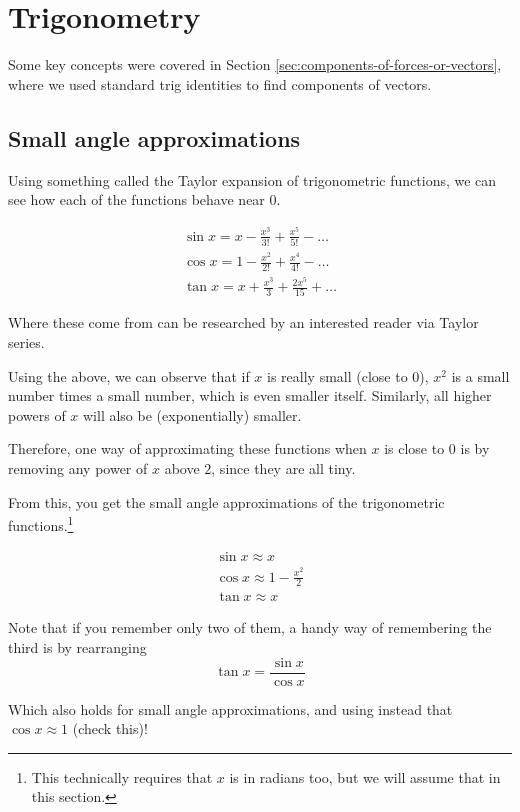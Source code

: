 \section{Trigonometry} \label{sec:trig}

Some key concepts were covered in Section \ref{sec:components-of-forces-or-vectors}, where we used standard trig identities to find components of vectors.

\subsection{Small angle approximations} \label{sec:trig-small-angle}

Using something called the Taylor expansion of trigonometric functions, we can see how each of the functions behave near $0$.

\begin{align*}
    \sin x = x - \frac{x^3}{3!} + \frac{x^5}{5!} - \dots \\
    \cos x = 1 - \frac{x^2}{2!} + \frac{x^4}{4!} - \dots \\
    \tan x = x + \frac{x^3}{3} + \frac{2x^5}{15} + \dots 
\end{align*}

Where these come from can be researched by an interested reader via Taylor series.

Using the above, we can observe that if $x$ is really small (close to $0$), $x^2$ is a small number times a small number, which is even smaller itself. Similarly, all higher powers of $x$ will also be (exponentially) smaller.

Therefore, one way of approximating these functions when $x$ is close to $0$ is by removing any power of $x$ above $2$, since they are all tiny.

From this, you get the small angle approximations of the trigonometric functions.\footnote{This technically requires that $x$ is in radians too, but we will assume that in this section.}

\begin{align*}
    \sin x \approx x \\
    \cos x \approx 1 -   \frac{x^2}{2} \\
    \tan x \approx x 
\end{align*}

Note that if you remember only two of them, a handy way of remembering the third is by rearranging 
\[ \tan x = \frac{\sin x}{\cos x}\]

Which also holds for small angle approximations, and using instead that $\cos x \approx 1$ (check this)!

